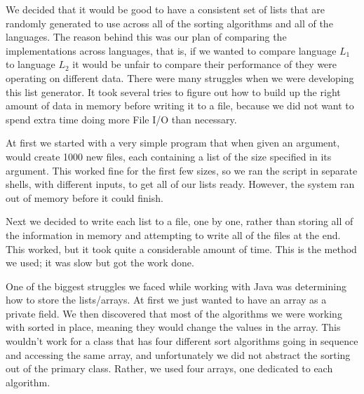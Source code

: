 \documentclass[12pt]{amsart}
\begin{document}
We decided that it would be good to have a consistent set of lists that are 
randomly generated to use across all of the sorting algorithms and all of the 
languages. The reason behind this was our plan of comparing the implementations across languages, that is, if we wanted to compare language $L_1$ to language $L_2$ it would be unfair to compare their performance of they were operating on different data. There were many struggles when we were developing this list generator.
It took several tries to figure out how to build up the right amount of data in 
memory before writing it to a file, because we did not want to spend extra time 
doing more File I/O than necessary. 

At first we started with a very simple program that when given an argument, would
create 1000 new files, each containing a list of the size specified in its 
argument. This worked fine for the first few sizes, so we ran the script in 
separate shells, with different inputs, to get all of our lists ready. However,
the system ran out of memory before it could finish.

Next we decided to write each list to a file, one by one, rather than storing all 
of the information in memory and attempting to write all of the files at the end. 
This worked, but it took quite a considerable amount of time. This is the method we used; it was slow but got the work done.

One of the biggest struggles we faced while working with Java was determining how 
to store the lists/arrays. At first we just wanted to have an array as a private 
field. We then discovered that most of the algorithms we were working with sorted 
in place, meaning they would change the values in the array. This wouldn't work 
for a class that has four different sort algorithms going in sequence and
accessing the same array, and unfortunately we did not abstract the sorting out 
of the primary class. Rather, we used four arrays, one dedicated to each 
algorithm.
\end{document}
